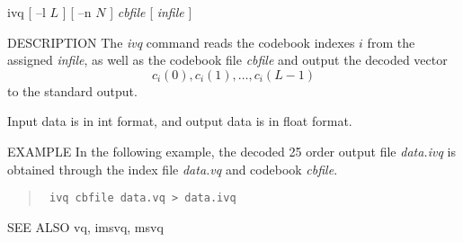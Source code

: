 
\begin{synopsis}
\item [ivq] [ --l $L$ ] [ --n $N$ ] {\em cbfile}  [ {\em infile} ] 
\end{synopsis}

\begin{qsection}{DESCRIPTION}
The {\em ivq} command reads the codebook indexes $i$ from 
the assigned {\em infile}, as well as the codebook file {\em cbfile}
and output the decoded vector
\begin{displaymath}
  c_i(0),c_i(1),\ldots,c_i(L-1)
\end{displaymath}
to the standard output.
\par
Input data is in int format, and output data is in float format.
\end{qsection}

\begin{options}
\end{options}

\begin{qsection}{EXAMPLE}
In the following example,
the decoded 25 order output file {\em data.ivq} is obtained
through the index file {\em data.vq} and codebook {\em cbfile}.
\begin{quote}
\verb! ivq cbfile data.vq > data.ivq !
\end{quote}
\end{qsection}

\begin{qsection}{SEE ALSO}
vq, imsvq, msvq
\end{qsection}
